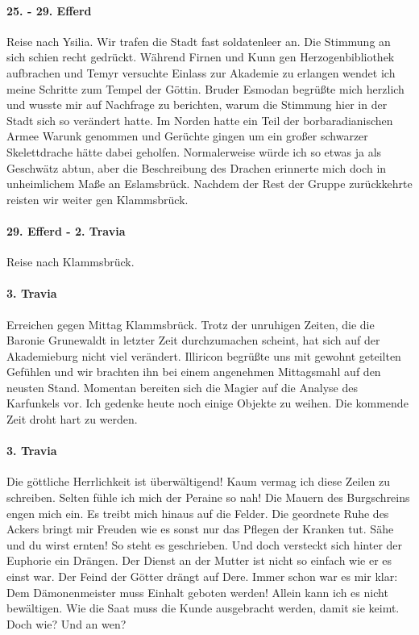 \paragraph{25. - 29. Efferd}
Reise nach Ysilia. Wir trafen die Stadt fast soldatenleer an. Die Stimmung an sich schien recht gedrückt. Während Firnen und Kunn gen Herzogenbibliothek aufbrachen und Temyr versuchte Einlass zur Akademie zu erlangen wendet ich meine Schritte zum Tempel der Göttin. Bruder Esmodan begrüßte mich herzlich und wusste mir auf Nachfrage zu berichten, warum die Stimmung hier in der Stadt sich so verändert hatte. Im Norden hatte ein Teil der borbaradianischen Armee Warunk genommen und Gerüchte gingen um ein großer schwarzer Skelettdrache hätte dabei geholfen. Normalerweise würde ich so etwas ja als Geschwätz abtun, aber die Beschreibung des Drachen erinnerte mich doch in unheimlichem Maße an Eslamsbrück. Nachdem der Rest der Gruppe zurückkehrte reisten wir weiter gen Klammsbrück.

\paragraph{29. Efferd - 2. Travia}
Reise nach Klammsbrück.

\paragraph{3. Travia}
Erreichen gegen Mittag Klammsbrück. Trotz der unruhigen Zeiten, die die Baronie Grunewaldt in letzter Zeit durchzumachen scheint, hat sich auf der Akademieburg nicht viel verändert. Illiricon begrüßte uns mit gewohnt geteilten Gefühlen und wir brachten ihn bei einem angenehmen Mittagsmahl auf den neusten Stand. Momentan bereiten sich die Magier auf die Analyse des Karfunkels vor. Ich gedenke heute noch einige Objekte zu weihen. Die kommende Zeit droht hart zu werden.

\paragraph{3. Travia}
Die göttliche Herrlichkeit ist überwältigend! Kaum vermag ich diese Zeilen zu schreiben. Selten fühle ich mich der Peraine so nah! Die Mauern des Burgschreins engen mich ein. Es treibt mich hinaus auf die Felder. Die geordnete Ruhe des Ackers bringt mir Freuden wie es sonst nur das Pflegen der Kranken tut. Sähe und du wirst ernten! So steht es geschrieben. Und doch versteckt sich hinter der Euphorie ein Drängen. Der Dienst an der Mutter ist nicht so einfach wie er es einst war. Der Feind der Götter drängt auf Dere. Immer schon war es mir klar: Dem Dämonenmeister muss Einhalt geboten werden! Allein kann ich es nicht bewältigen. Wie die Saat muss die Kunde ausgebracht werden, damit sie keimt. Doch wie? Und an wen?

